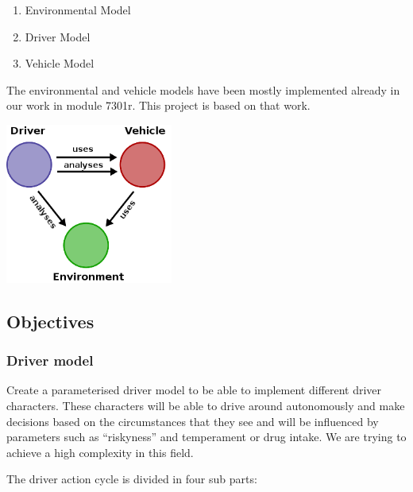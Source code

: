 \documentclass[a4paper,10pt,titlepage]{article}
\begin{document}
\begin{enumerate}
 \item Environmental Model
 \item Driver Model
 \item Vehicle Model
\end{enumerate}
The environmental and vehicle models have been mostly implemented already in our work in module 7301r. This project is based on that work.

\begin{center}
\includegraphics[width=5.5cm]{skizze.png}
\end{center}

\subsection{Objectives}
\subsubsection{Driver model}
 Create a parameterised driver model to be able to implement different 
 driver characters. These characters will be able to drive around autonomously 
 and make decisions based on the circumstances that they see and will be 
 influenced by parameters such as ``riskyness'' and temperament or drug intake.
 We are trying to achieve a high complexity in this field.

 The driver action cycle is divided in four sub parts:
 
\end{document}
